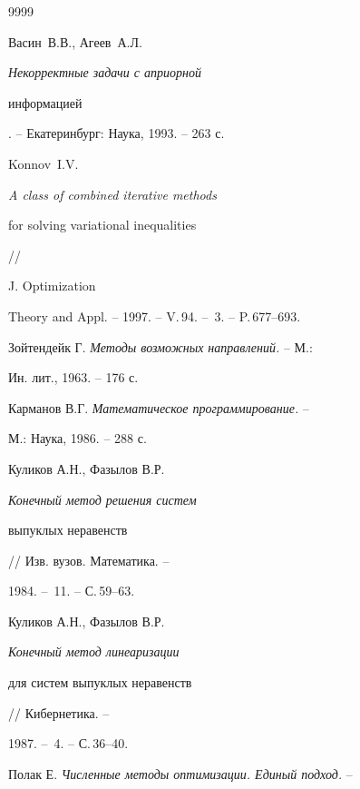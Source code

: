 \begin{thebibliography}{9999}







Васин~В.В., Агеев~А.Л. {\em Некорректные задачи с априорной


информацией}. -- Екатеринбург: Наука, 1993. -- 263 с.







Konnov~I.V.


{\em A class of combined iterative methods


for solving variational inequalities} //


J. Optimization


Theory and Appl. -- 1997. -- V.\,94. -- \No\,3. -- P.\,677--693.







Зойтендейк Г. {\em Методы возможных направлений.} -- М.:


Ин. лит., 1963. -- 176 с.







Карманов В.Г. {\em Математическое программирование.} --


М.: Наука, 1986. -- 288 с.







Куликов А.Н., Фазылов В.Р. {\em Конечный метод решения систем


выпуклых неравенств} // Изв. вузов. Математика. --


1984. -- \No\,11. -- С.\,59--63.







Куликов А.Н., Фазылов В.Р. {\em Конечный метод линеаризации


для систем выпуклых неравенств} // Кибернетика. --


 1987. -- \No\,4. -- С.\,36--40.







Полак Е. {\em Численные методы оптимизации. Единый подход.} --



\end{thebibliography}
